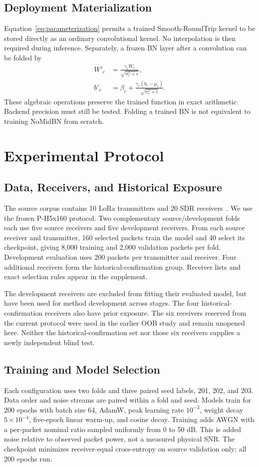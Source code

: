 \documentclass[journal]{IEEEtran}
\begin{document}
\subsection{Deployment Materialization}
Equation~\eqref{eq:parameterization} permits a trained Smooth-RoundTrip kernel to be stored directly as an ordinary convolutional kernel. No interpolation is then required during inference. Separately, a frozen BN layer after a convolution can be folded by
\begin{align}
W'_c&=\frac{\gamma_c W_c}{\sqrt{\sigma_c^2+\epsilon}},\\
b'_c&=\beta_c+\frac{\gamma_c(b_c-\mu_c)}{\sqrt{\sigma_c^2+\epsilon}}.
\end{align}
These algebraic operations preserve the trained function in exact arithmetic. Backend precision must still be tested. Folding a trained BN is not equivalent to training NoMidBN from scratch.

\section{Experimental Protocol}
\subsection{Data, Receivers, and Historical Exposure}
The source corpus contains 10 LoRa transmitters and 20 SDR receivers~\cite{shen2024}. We use the frozen P-H5x160 protocol. Two complementary source/development folds each use five source receivers and five development receivers. From each source receiver and transmitter, 160 selected packets train the model and 40 select its checkpoint, giving 8,000 training and 2,000 validation packets per fold. Development evaluation uses 200 packets per transmitter and receiver. Four additional receivers form the historical-confirmation group. Receiver lists and exact selection rules appear in the supplement.

The development receivers are excluded from fitting their evaluated model, but have been used for method development across stages. The four historical-confirmation receivers also have prior exposure. The six receivers reserved from the current protocol were used in the earlier OOB study and remain unopened here. Neither the historical-confirmation set nor those six receivers supplies a newly independent blind test.

\subsection{Training and Model Selection}
Each configuration uses two folds and three paired seed labels, 201, 202, and 203. Data order and noise streams are paired within a fold and seed. Models train for 200 epochs with batch size 64, AdamW, peak learning rate $10^{-3}$, weight decay $5\times10^{-4}$, five-epoch linear warm-up, and cosine decay. Training adds AWGN with a per-packet nominal ratio sampled uniformly from 0 to 50 dB. This is added noise relative to observed packet power, not a measured physical SNR. The checkpoint minimizes receiver-equal cross-entropy on source validation only; all 200 epochs run.
\end{document}

